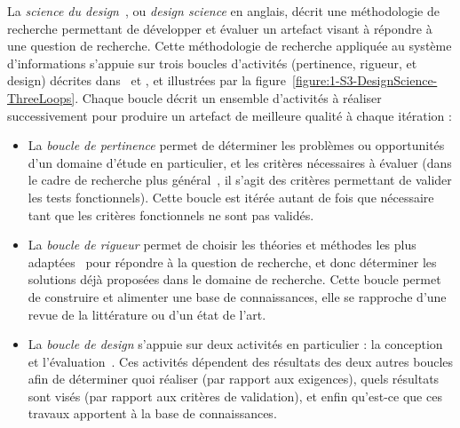 La \textit{science du design}~\cite{hevner2004design}\cite{hevner2007three}\cite{peffers2007design}\cite{pascal2011approche}, ou \textit{design science} en anglais, décrit une méthodologie de recherche permettant de développer et évaluer un artefact visant à répondre à une question de recherche.
Cette méthodologie de recherche appliquée au système d'informations s'appuie sur trois boucles d'activités (pertinence, rigueur, et design) décrites dans~\cite{hevner2007three} et \cite{pascal2011approche}, et illustrées par la figure~\ref{figure:1-S3-DesignScience-ThreeLoops}.
Chaque boucle décrit un ensemble d'activités à réaliser successivement pour produire un artefact de meilleure qualité à chaque itération :
\begin{itemize}
\item La \textit{boucle de pertinence} permet de déterminer les problèmes ou opportunités d'un domaine d'étude en particulier, et les critères nécessaires à évaluer (dans le cadre de recherche plus général~\cite{hevner2004design}, il s'agit des critères permettant de valider les tests fonctionnels).
Cette boucle est itérée autant de fois que nécessaire tant que les critères fonctionnels ne sont pas validés.

\item La \textit{boucle de rigueur} permet de choisir les théories et méthodes les plus adaptées~\cite{pascal2011approche} pour répondre à la question de recherche, et donc déterminer les solutions déjà proposées dans le domaine de recherche.
Cette boucle permet de construire et alimenter une base de connaissances, elle se rapproche d'une revue de la littérature ou d'un état de l'art.

\item La \textit{boucle de design} s'appuie sur deux activités en particulier : la conception et l'évaluation~\cite{pascal2011approche}.
Ces activités dépendent des résultats des deux autres boucles afin de déterminer quoi réaliser (par rapport aux exigences), quels résultats sont visés (par rapport aux critères de validation), et enfin qu'est-ce que ces travaux apportent à la base de connaissances.
\end{itemize}

\bigskip

